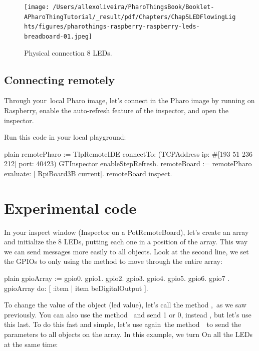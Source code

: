 \documentclass[10pt,twoside,english]{_support/latex/sbabook/sbabook}
\begin{document}
\begin{figure}

\begin{center}
\texttt{[image: /Users/allexoliveira/PharoThingsBook/Booklet-APharoThingTutorial/\_result/pdf/Chapters/Chap5LEDFlowingLights/figures/pharothings-raspberry-raspberry-leds-breadboard-01.jpeg]}\caption{Physical connection 8 LEDs.\label{Physical8Leds}}\end{center}
\end{figure}

\subsection{Connecting remotely}
Through your local Pharo image, let's connect in the Pharo image by running on Raspberry, enable the auto-refresh feature of the inspector, and open the inspector.

Run this code in your local playground:

\begin{displaycode}{plain}
remotePharo := TlpRemoteIDE connectTo: (TCPAddress ip: #[193 51 236 212] port: 40423)
GTInspector enableStepRefresh.
remoteBoard := remotePharo evaluate: [ RpiBoard3B current].
remoteBoard inspect.
\end{displaycode}
\section{Experimental code}
In your inspect window (Inspector on a PotRemoteBoard), let’s create an array and initialize the 8 LEDs, putting each one in a position of the array.  This way we can send messages more easily to all objects. Look at the second line, we set the GPIOs to  only using the method  to move through the entire array:

\begin{displaycode}{plain}
gpioArray := { gpio0. gpio1. gpio2. gpio3. gpio4. gpio5. gpio6. gpio7 }.
gpioArray do: [ :item | item beDigitalOutput ].
\end{displaycode}

To change the value of the object (led value), let's call the method , as we saw previously. You can also use the method  and send 1 or 0, instead , but let's use this last. To do this fast and simple, let's use again the method  to send the parameters to all objects on the array. In this example, we turn On all the LEDs at the same time:
\end{document}
